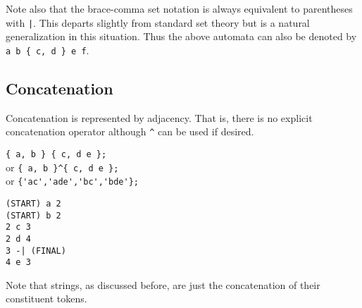 Note also that the brace-comma set notation is always equivalent to
parentheses with \verb#|#.
This departs slightly from standard set theory but is a natural
generalization in this situation.
Thus the above automata can also be denoted by
\verb#a b { c, d } e f#.

\subsection{Concatenation}
Concatenation is represented by adjacency.
That is, there is no explicit concatenation operator although \verb#^# can
be used if desired.
\begin{center}\begin{minipage}[t]{3in}\begin{minipage}[t]{3in}\begin{tabbing}
\qquad \= \verb#{ a, b } { c, d e };#\\
or \> \verb#{ a, b }^{ c, d e };#\\
or \> \verb#{'ac','ade','bc','bde'};#
\end{tabbing}\end{minipage}\end{minipage}
\begin{minipage}[t]{1.6in}\begin{verbatim}
(START) a 2
(START) b 2
2 c 3
2 d 4
3 -| (FINAL)
4 e 3
\end{verbatim}\end{minipage}\end{center}
Note that strings, as discussed before, are just the concatenation of their
constituent tokens.

